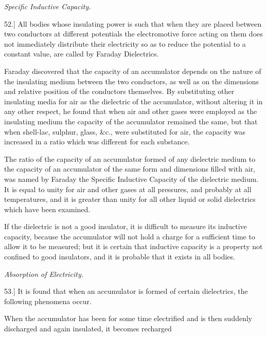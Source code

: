 \documentclass[11pt,a4paper]{article}
\begin{document}
\begin{center}
\textit{Specific Inductive Capacity.}
\end{center}

52.] All bodies whose insulating power is such that when they
are placed between two conductors at different potentials the
electromotive force acting on them does not immediately distribute
their electricity so as to reduce the potential to a constant value, are
called by Faraday Dielectrics.

Faraday discovered that the capacity of an accumulator depends
on the nature of the insulating medium between the two conductors,
as well as on the dimensions and relative position of the conductors
themselves. By substituting other insulating media for air as the
dielectric of the accumulator, without altering it in any other
respect, he found that when air and other gases were employed as
the insulating medium the capacity of the accumulator remained the
same, but that when shell-lac, sulphur, glass, \&c., were substituted
for air, the capacity was increased in a ratio which was different
for each substance.

The ratio of the capacity of an accumulator formed of any dielectric
medium to the capacity of an accumulator of the same form and
dimensions filled with air, was named by Faraday the Specific
Inductive Capacity of the dielectric medium. It is equal to unity
for air and other gases at all pressures, and probably at all
temperatures, and it is greater than unity for all other liquid or solid
dielectrics which have been examined.

If the dielectric is not a good insulator, it is difficult to measure
its inductive capacity, because the accumulator will not hold a
charge for a sufficient time to allow it to be measured; but it is
certain that inductive capacity is a property not confined to good
insulators, and it is probable that it exists in all bodies.

\begin{center}
\textit{Absorption of Electricity.}
\end{center}

53.] It is found that when an accumulator is formed of certain
dielectrics, the following phenomena occur.

When the accumulator has been for some time electrified and is
then suddenly discharged and again insulated, it becomes recharged

\clearpage
\setcounter{footnote}{0}
\end{document}
